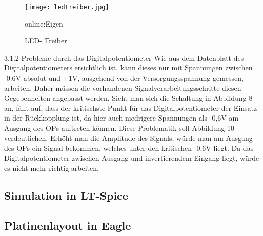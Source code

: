 \begin{figure}[H]
	\centering
	\texttt{[image: ledtreiber.jpg]}
	\caption[Schaltung des LED- Treibers]{LED- Treiber} \gls{online:Eigen}
	\label{fig:ledtreiber}
\end{figure}

3.1.2 Probleme durch das Digitalpotentiometer
Wie aus dem Datenblatt des Digitalpotentiometers ersichtlich ist, kann dieses nur
mit Spannungen zwischen -0.6V absolut und +1V, ausgehend von der Versorgungsspannung
gemessen, arbeiten. Daher müssen die vorhandenen Signalverarbeitungsschritte
diesen Gegebenheiten angepasst werden.
Sieht man sich die Schaltung in Abbildung 8 an, fällt auf, dass der kritischste
Punkt für das Digitalpotentiometer der Einsatz in der Rückkopplung ist, da hier
auch niedrigere Spannungen als -0,6V am Ausgang des OPs auftreten können. Diese
Problematik soll Abbildung 10 verdeutlichen. Erhöht man die Amplitude des
Signals, würde man am Ausgang des OPs ein Signal bekommen, welches unter den
kritischen -0,6V liegt. Da das Digitalpotentiometer zwischen Ausgang und invertierendem
Eingang liegt, würde es nicht mehr richtig arbeiten.



\subsection{Simulation in LT-Spice}
\label{subsec:Unterabschnitt1}
 
\subsection{Platinenlayout in Eagle}
\label{subsec:Unterabschnitt12}

